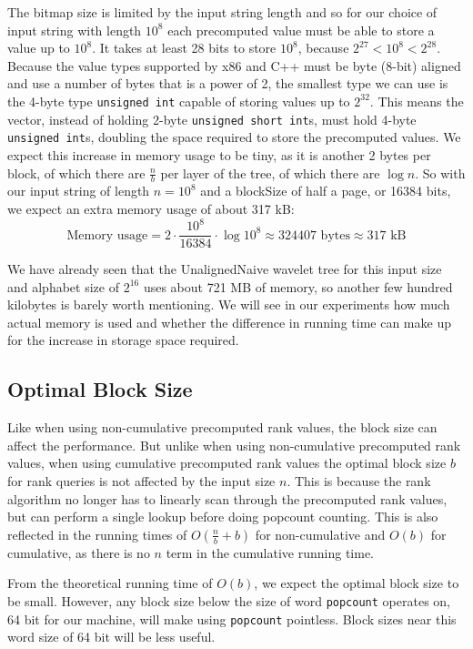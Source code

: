 The bitmap size is limited by the input string length and so for our choice of input string with length $10^8$ each precomputed value must be able to store a value up to $10^8$.
It takes at least 28 bits to store $10^8$, because $2^{27} < 10^8 < 2^{28}$.
Because the value types supported by x86 and C++ must be byte (8-bit) aligned and use a number of bytes that is a power of 2, the smallest type we can use is the 4-byte type \texttt{unsigned int} capable of storing values up to $2^{32}$.
This means the vector, instead of holding 2-byte \texttt{unsigned short int}s, must hold 4-byte \texttt{unsigned int}s, doubling the space required to store the precomputed values.
We expect this increase in memory usage to be tiny, as it is another 2 bytes per block, of which there are $\frac{n}{b}$ per layer of the tree, of which there are $\log n$.
So with our input string of length $n = 10^8$ and a blockSize of half a page, or 16384 bits, we expect an extra memory usage of about 317 kB:
\[\text{Memory usage} = 2 \cdot \frac{10^8}{16384} \cdot \log 10^8 \approx 324407 \text{ bytes} \approx 317 \text{ kB} \]

We have already seen that the UnalignedNaive wavelet tree for this input size and alphabet size of $2^{16}$ uses about 721 MB of memory, so another few hundred kilobytes is barely worth mentioning.
We will see in our experiments how much actual memory is used and whether the difference in running time can make up for the increase in storage space required.

\subsection{Optimal Block Size}
Like when using non-cumulative precomputed rank values, the block size can affect the performance.
But unlike when using non-cumulative precomputed rank values, when using cumulative precomputed rank values the optimal block size $b$ for rank queries is not affected by the input size $n$.
This is because the rank algorithm no longer has to linearly scan through the precomputed rank values, but can perform a single lookup before doing popcount counting.
This is also reflected in the running times of $O(\frac{n}{b} + b)$ for non-cumulative and $O(b)$ for cumulative, as there is no $n$ term in the cumulative running time.

From the theoretical running time of $O(b)$, we expect the optimal block size to be small.
However, any block size below the size of word \texttt{popcount} operates on, 64 bit for our machine, will make using \texttt{popcount} pointless.
Block sizes near this word size of 64 bit will be less useful.

